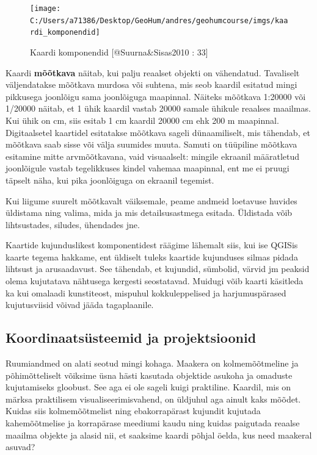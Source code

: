 \documentclass[
]{book}
\begin{document}
\begin{figure}

{\centering \texttt{[image: C:/Users/a71386/Desktop/GeoHum/andres/geohumcourse/imgs/kaardi\_komponendid]} 

}

\caption{Kaardi komponendid [@Suurna&Sisas2010 : 33]}\label{fig:kaardi-komponendid}
\end{figure}

Kaardi \textbf{mõõtkava} näitab, kui palju reaalset objekti on vähendatud. Tavaliselt väljendatakse mõõtkava murdosa või suhtena, mis seob kaardil esitatud mingi pikkusega joonlõigu sama joonlõiguga maapinnal. Näiteks mõõtkava 1:20000 või 1/20000 näitab, et 1 ühik kaardil vastab 20000 samale ühikule reaalses maailmas. Kui ühik on cm, siis esitab 1 cm kaardil 20000 cm ehk 200 m maapinnal. Digitaalsetel kaartidel esitatakse mõõtkava sageli dünaamiliselt, mis tähendab, et mõõtkava saab sisse või välja suumides muuta. Samuti on tüüpiline mõõtkava esitamine mitte arvmõõtkavana, vaid visuaalselt: mingile ekraanil määratletud joonlõigule vastab tegelikkuses kindel vahemaa maapinnal, ent me ei pruugi täpselt näha, kui pika joonlõiguga on ekraanil tegemist.

Kui liigume suurelt mõõtkavalt väiksemale, peame andmeid loetavuse huvides üldistama ning valima, mida ja mis detailsusastmega esitada. Üldistada võib lihtsustades, siludes, ühendades jne.

\hypertarget{htmlwidget-ad6b0a4b17cf482b4af0}{}
\begin{leaflet}

\end{leaflet}

Kaartide kujunduslikest komponentidest räägime lähemalt siis, kui ise QGISis kaarte tegema hakkame, ent üldiselt tuleks kaartide kujunduses silmas pidada lihtsust ja arusaadavust. See tähendab, et kujundid, sümbolid, värvid jm peaksid olema kujutatava nähtusega kergesti seostatavad. Muidugi võib kaarti käsitleda ka kui omalaadi kunstiteost, mispuhul kokkuleppelised ja harjumuspärased kujutusviisid võivad jääda tagaplaanile.

\hypertarget{koordinaatsuxfcsteemid-ja-projektsioonid}{%
\subsection{Koordinaatsüsteemid ja projektsioonid}\label{koordinaatsuxfcsteemid-ja-projektsioonid}}

Ruumiandmed on alati seotud mingi kohaga. Maakera on kolmemõõtmeline ja põhimõtteliselt võiksime üsna hästi kasutada objektide asukoha ja omaduste kujutamiseks gloobust. See aga ei ole sageli kuigi praktiline. Kaardil, mis on märksa praktilisem visualiseerimisvahend, on üldjuhul aga ainult kaks mõõdet. Kuidas siis kolmemõõtmelist ning ebakorrapärast kujundit kujutada kahemõõtmelise ja korrapärase meediumi kaudu ning kuidas paigutada reaalse maailma objekte ja alasid nii, et saaksime kaardi põhjal öelda, kus need maakeral asuvad?
\end{document}
